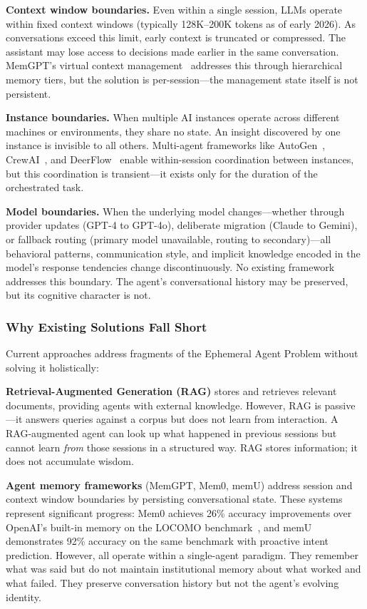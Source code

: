 \documentclass[11pt,a4paper]{article}
\begin{document}
\textbf{Context window boundaries.} Even within a single session, LLMs operate within fixed context windows (typically 128K--200K tokens as of early 2026). As conversations exceed this limit, early context is truncated or compressed. The assistant may lose access to decisions made earlier in the same conversation. MemGPT's virtual context management~\citep{packer2023memgpt} addresses this through hierarchical memory tiers, but the solution is per-session---the management state itself is not persistent.

\textbf{Instance boundaries.} When multiple AI instances operate across different machines or environments, they share no state. An insight discovered by one instance is invisible to all others. Multi-agent frameworks like AutoGen~\citep{autogen2024}, CrewAI~\citep{crewai2024}, and DeerFlow~\citep{deerflow2025} enable within-session coordination between instances, but this coordination is transient---it exists only for the duration of the orchestrated task.

\textbf{Model boundaries.} When the underlying model changes---whether through provider updates (GPT-4 to GPT-4o), deliberate migration (Claude to Gemini), or fallback routing (primary model unavailable, routing to secondary)---all behavioral patterns, communication style, and implicit knowledge encoded in the model's response tendencies change discontinuously. No existing framework addresses this boundary. The agent's conversational history may be preserved, but its cognitive character is not.


\subsubsection{Why Existing Solutions Fall Short}
\label{sec:existing-fall-short}

Current approaches address fragments of the Ephemeral Agent Problem without solving it holistically:

\textbf{Retrieval-Augmented Generation (RAG)} stores and retrieves relevant documents, providing agents with external knowledge. However, RAG is passive---it answers queries against a corpus but does not learn from interaction. A RAG-augmented agent can look up what happened in previous sessions but cannot learn \emph{from} those sessions in a structured way. RAG stores information; it does not accumulate wisdom.

\textbf{Agent memory frameworks} (MemGPT, Mem0, memU) address session and context window boundaries by persisting conversational state. These systems represent significant progress: Mem0 achieves 26\% accuracy improvements over OpenAI's built-in memory on the LOCOMO benchmark~\citep{chhikara2025mem0}, and memU~\citep{memu2025} demonstrates 92\% accuracy on the same benchmark with proactive intent prediction. However, all operate within a single-agent paradigm. They remember what was said but do not maintain institutional memory about what worked and what failed. They preserve conversation history but not the agent's evolving identity.
\end{document}
